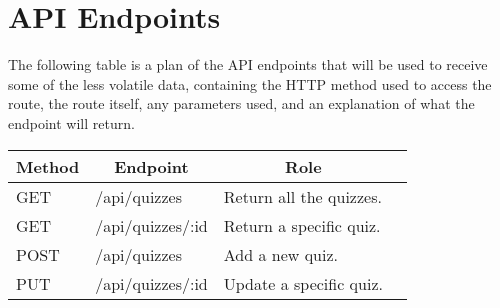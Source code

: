 \section{API Endpoints}
The following table is a plan of the API endpoints that will be used to receive some of the less volatile data, containing the HTTP method used to access the route, the route itself, any parameters used, and an explanation of what the endpoint will return.

\begin{table}[!htbp]
\centering
\label{my-label}
\begin{tabular}{|l|l|l|l|}
\hline
\multicolumn{1}{|c|}{{\bf Method}} & \multicolumn{1}{c|}{{\bf Endpoint}} & \multicolumn{1}{c|}{{\bf Role}} \\ \hline
GET                                & /api/quizzes                                                       & Return all the quizzes.         \\ \hline
GET                                & /api/quizzes/:id                                & Return a specific quiz.         \\ \hline
POST                               & /api/quizzes                                                       & Add a new quiz.                 \\ \hline
PUT                                & /api/quizzes/:id                                & Update a specific quiz.         \\ \hline
\end{tabular}
\end{table}
